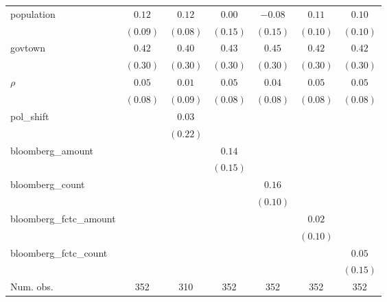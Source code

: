 \begin{table}[!h]
\begin{center}
\begin{tabular}{l c c c c c c }
population              & $0.12$       & $0.12$       & $0.00$       & $-0.08$      & $0.11$       & $0.10$       \\
                        & $(0.09)$     & $(0.08)$     & $(0.15)$     & $(0.15)$     & $(0.10)$     & $(0.10)$     \\
govtown                 & $0.42$       & $0.40$       & $0.43$       & $0.45$       & $0.42$       & $0.42$       \\
                        & $(0.30)$     & $(0.30)$     & $(0.30)$     & $(0.30)$     & $(0.30)$     & $(0.30)$     \\
$\rho$                  & $0.05$       & $0.01$       & $0.05$       & $0.04$       & $0.05$       & $0.05$       \\
                        & $(0.08)$     & $(0.09)$     & $(0.08)$     & $(0.08)$     & $(0.08)$     & $(0.08)$     \\
pol\_shift              &              & $0.03$       &              &              &              &              \\
                        &              & $(0.22)$     &              &              &              &              \\
bloomberg\_amount       &              &              & $0.14$       &              &              &              \\
                        &              &              & $(0.15)$     &              &              &              \\
bloomberg\_count        &              &              &              & $0.16$       &              &              \\
                        &              &              &              & $(0.10)$     &              &              \\
bloomberg\_fctc\_amount &              &              &              &              & $0.02$       &              \\
                        &              &              &              &              & $(0.10)$     &              \\
bloomberg\_fctc\_count  &              &              &              &              &              & $0.05$       \\
                        &              &              &              &              &              & $(0.15)$     \\
\midrule
Num. obs.               & 352          & 310          & 352          & 352          & 352          & 352          \\

\end{tabular}
\end{center}
\end{table}
